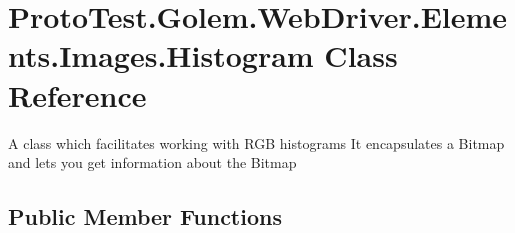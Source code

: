 \hypertarget{class_proto_test_1_1_golem_1_1_web_driver_1_1_elements_1_1_images_1_1_histogram}{\section{Proto\-Test.\-Golem.\-Web\-Driver.\-Elements.\-Images.\-Histogram Class Reference}
\label{class_proto_test_1_1_golem_1_1_web_driver_1_1_elements_1_1_images_1_1_histogram}
}


A class which facilitates working with R\-G\-B histograms It encapsulates a Bitmap and lets you get information about the Bitmap  


\subsection*{Public Member Functions}
